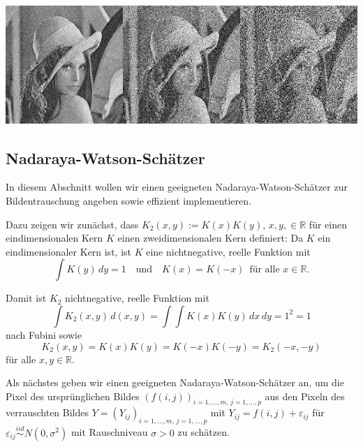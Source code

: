 \documentclass[10pt,]{article}
\begin{document}
\includegraphics{project2_files/figure-latex/Noise Example-1.pdf}

\subsection{Nadaraya-Watson-Schätzer}\label{nadaraya-watson-schatzer}

In diesem Abschnitt wollen wir einen geeigneten Nadaraya-Watson-Schätzer
zur Bildentrauschung angeben sowie effizient implementieren.

Dazu zeigen wir zunächst, dass
\(K_2(x,y) := K(x)K(y), \, x,y, \in \mathbb{R}\) für einen
eindimensionalen Kern \(K\) einen zweidimensionalen Kern definiert: Da
\(K\) ein eindimensionaler Kern ist, ist \(K\) eine nichtnegative,
reelle Funktion mit \[
\int K(y) \, dy = 1 \quad \text{und} \quad K(x) = K(-x) \, \text{ für alle } x\in \mathbb{R}.
\]

Damit ist \(K_2\) nichtnegative, reelle Funktion mit \[
\int K_2(x,y) \, d(x,y) = \int \int K(x) K(y) \, dx \, dy = 1^2 = 1
\] nach Fubini sowie \[
K_2(x,y) = K(x) K(y) = K(-x) K(-y) = K_2(-x,-y)
\] für alle \(x,y \in \mathbb{R}\).

Als nächstes geben wir einen geeigneten Nadaraya-Watson-Schätzer an, um
die Pixel des ursprünglichen Bildes
\((f(i,j))_{i=1,\ldots,m, \, j =1,\ldots,p}\) aus den Pixeln des
verrauschten Bildes \(Y = (Y_{ij})_{i=1,\ldots,m, \, j =1,\ldots,p}\)
mit \(Y_{ij} = f(i,j) + \varepsilon_{ij}\) für
\(\varepsilon_{ij} \overset{iid}{\sim} N(0,\sigma^2)\) mit Rauschniveau
\(\sigma > 0\) zu schätzen.
\end{document}
